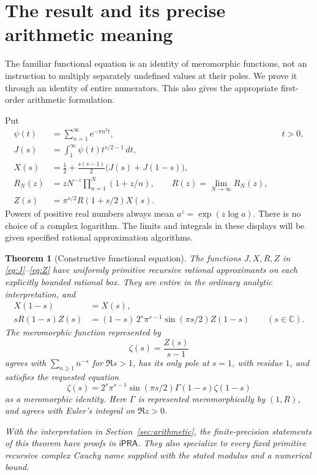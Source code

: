 \documentclass[11pt,letterpaper]{article}
\numberwithin{equation}{section}
\newtheorem{theorem}{Theorem}[section]
\theoremstyle{definition}
\newcommand{\ipra}{\mathsf{iPRA}}
\newcommand{\C}{\mathbb C}
\newcommand{\e}{\mathrm e}
\newcommand{\ps}{\psi}
\newcommand{\gamrec}{R}
\begin{document}
\section{The result and its precise arithmetic meaning}

The familiar functional equation is an identity of meromorphic functions,
not an instruction to multiply separately undefined values at their poles.
We prove it through an identity of entire numerators. This also gives the
appropriate first-order arithmetic formulation.

Put
\begin{align}
 \ps(t)&=\sum_{n=1}^{\infty}\e^{-\pi n^2t}, &&t>0,\label{eq:psi}\\
 J(s)&=\int_1^\infty \ps(t)t^{s/2-1}\,dt,\label{eq:J}\\
 X(s)&=\frac12+\frac{s(s-1)}2\bigl(J(s)+J(1-s)\bigr),\label{eq:X}\\
 \gamrec_N(z)&=zN^{-z}\prod_{n=1}^N(1+z/n),\qquad
 \gamrec(z)=\lim_{N\to\infty}\gamrec_N(z),\label{eq:R}\\
 Z(s)&=\pi^{s/2}\gamrec(1+s/2)X(s).\label{eq:Z}
\end{align}
Powers of positive real numbers always mean \(a^z=\exp(z\log a)\).
There is no choice of a complex logarithm. The limits and integrals in
these displays will be given specified rational approximation algorithms.

\begin{theorem}[Constructive functional equation]\label{thm:main}
The functions \(J,X,\gamrec,Z\) in
\eqref{eq:J}--\eqref{eq:Z} have uniformly primitive recursive rational
approximants on each explicitly bounded rational box. They are entire in
the ordinary analytic interpretation, and
\begin{align}
 X(1-s)&=X(s),\label{eq:xiFE}\\
 s\gamrec(1-s)Z(s)
 &=(1-s)\,2^s\pi^{s-1}\sin(\pi s/2)Z(1-s) \qquad(s\in\C).
 \label{eq:entireFE}
\end{align}
The meromorphic function represented by
\[
                    \zeta(s)=\frac{Z(s)}{s-1}
                    \tag{\(\ast\)}
\]
agrees with \(\sum_{n\ge1}n^{-s}\) for \(\Re s>1\), has its only pole at
\(s=1\), with residue \(1\), and satisfies the requested equation
\begin{equation}
 \boxed{\zeta(s)=2^s\pi^{s-1}\sin(\pi s/2)\Gamma(1-s)\zeta(1-s)}
 \label{eq:standardFE}
\end{equation}
as a meromorphic identity. Here \(\Gamma\) is represented meromorphically
by \((1,\gamrec)\), and agrees with Euler's integral on \(\Re z>0\).

With the interpretation in Section~\ref{sec:arithmetic}, the
finite-precision statements of this theorem have proofs in \(\ipra\).
They also specialize to every fixed primitive recursive complex Cauchy
name supplied with the stated modulus and a numerical bound.
\end{theorem}
\end{document}
